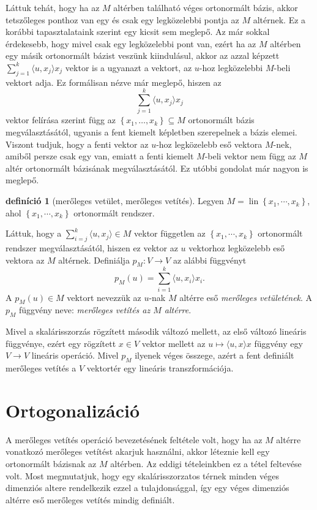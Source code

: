 \documentclass[9pt, a4paper, showtrims]{memoir}
\theoremstyle{plain}
\theoremstyle{remark}
\theoremstyle{definition}
\newtheorem{definition}[proposition]{definíció}
\DeclareMathOperator{\lin}{lin}
\newcommand{\ip}[2]{\langle#1,#2\rangle}
\begin{document}
Láttuk tehát, hogy ha az $M$ altérben található véges ortonormált bázis,
akkor tetszőleges ponthoz van egy és csak egy legközelebbi pontja az $M$ altérnek.
Ez a korábbi tapasztalataink szerint egy kicsit sem meglepő.
Az már sokkal érdekesebb, hogy mivel csak egy legközelebbi pont van, ezért
ha az $M$ altérben egy másik ortonormált bázist veszünk kiindulásul, akkor az azzal képzett
$\sum_{j=1}^k\ip{u}{x_j}x_j$ vektor is a ugyanazt a vektort, az $u$-hoz legközelebbi $M$-beli vektort adja.
Ez formálisan nézve már meglepő, hiszen az 
\[
    \sum_{j=1}^k\ip{u}{x_j}x_j
\]
vektor felírása szerint függ az $\left\{ x_1,\dots,x_k \right\}\subseteq M$ ortonormált bázis megválasztásától,
ugyanis a fent kiemelt képletben szerepelnek a bázis elemei. 
Viszont tudjuk, hogy a fenti vektor az $u$-hoz legközelebb eső vektora $M$-nek, amiből persze csak egy van,
emiatt a fenti kiemelt $M$-beli vektor nem függ az $M$ altér ortonormált bázisának megválasztásától.
Ez utóbbi gondolat már nagyon is meglepő.
\begin{definition}[merőleges vetület, merőleges vetítés]
    Legyen $M=\lin\left\{ x_1,\cdots,x_k \right\}$, 
    ahol $\left\{ x_1,\cdots,x_k \right\}$ ortonormált rendszer.

    Láttuk, hogy a 
    $\sum_{i=j}^k\ip{u}{x_j}\in M$ vektor független
    az $\left\{ x_1,\cdots,x_k \right\}$ ortonormált rendszer megválasztásától, 
    hiszen ez vektor az $u$ vektorhoz legközelebb eső vektora az $M$ altérnek.
    Definiálja $p_M:V\to V$ az alábbi függvényt
    \[
        p_M\left( u \right)=
        \sum_{i=1}^k\ip{u}{x_i}x_i.
    \]
    A $p_M\left( u \right)\in M$ vektort nevezzük az $u$-nak $M$ altérre eső \emph{merőleges vetületének}.
    A $p_M$ függvény neve: \emph{merőleges vetítés az $M$ altérre}.
\end{definition}
Mivel a skalárisszorzás rögzített második változó mellett, 
az első változó lineáris függvénye,
ezért egy rögzített $x\in V$ vektor mellett az $u\mapsto\ip{u}{x}x$ függvény egy $V\to V$ lineáris operáció.
Mivel $p_M$ ilyenek véges összege, azért a fent definiált merőleges vetítés a $V$ vektortér egy lineáris transzformációja.
\section{Ortogonalizáció}
A merőleges vetítés operáció bevezetésének feltétele volt, hogy ha az $M$ altérre vonatkozó
merőleges vetítést akarjuk használni, akkor léteznie kell egy ortonormált bázisnak az $M$ altérben.
Az eddigi tételeinkben ez a tétel feltevése volt.
Most megmutatjuk, hogy egy skalárisszorzatos térnek minden véges dimenziós altere rendelkezik ezzel a 
tulajdonsággal, így egy véges dimenziós altérre eső merőleges vetítés mindig definiált.
\end{document}
